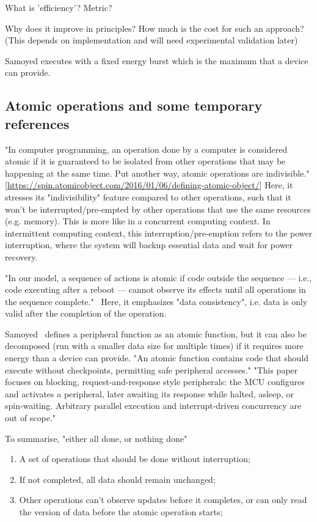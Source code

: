 What is 'efficiency'? Metric?

Why does it improve in principles? How much is the cost for such an approach? (This depends on implementation and will need experimental validation later)

Samoyed executes with a fixed energy burst which is the maximum that a device can provide. 



\subsection{Atomic operations and some temporary references}

"In computer programming, an operation done by a computer is considered atomic if it is guaranteed to be isolated from other operations that may be happening at the same time. Put another way, atomic operations are indivisible." 
[\url{https://spin.atomicobject.com/2016/01/06/defining-atomic-object/}]
Here, it stresses its "indivisibility" feature compared to other operations, such that it won't be interrupted/pre-empted by other operations that use the same resources (e.g. memory). 
This is more like in a concurrent computing context. In intermittent computing context, this interruption/pre-emption refers to the power interruption, where the system will backup essential data and wait for power recovery. 

"In our model, a sequence of actions is atomic if code outside the sequence — i.e., code executing after a reboot — cannot observe its effects until all operations in the sequence complete."~\cite{lucia2015simpler}
Here, it emphasizes "data consistency", i.e. data is only valid after the completion of the operation. 

Samoyed~\cite{maeng2019supporting} defines a peripheral function as an atomic function, but it can also be decomposed (run with a smaller data size for multiple times) if it requires more energy than a device can provide. 
"An atomic function contains code that should execute without checkpoints, permitting safe peripheral accesses."
"This paper focuses on blocking, request-and-response style peripherals: the MCU configures and activates a peripheral, later awaiting its response while halted, asleep, or spin-waiting. Arbitrary parallel execution and interrupt-driven concurrency are out of scope."

To summarise, "either all done, or nothing done"
\begin{enumerate}
    \item A set of operations that should be done without interruption; 
    \item If not completed, all data should remain unchanged;
    \item Other operations can't observe updates before it completes, or can only read the version of data before the atomic operation starts;
\end{enumerate}

